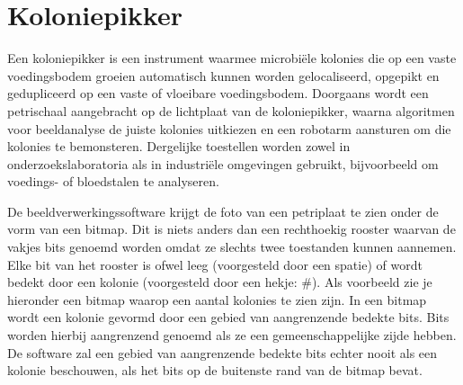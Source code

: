
\section*{Koloniepikker}
Een koloniepikker is een instrument waarmee microbi\"ele kolonies die op een vaste voedingsbodem groeien automatisch kunnen worden gelocaliseerd, opgepikt en gedupliceerd op een vaste of vloeibare voedingsbodem. Doorgaans wordt een petrischaal aangebracht op de lichtplaat van de koloniepikker, waarna algoritmen voor beeldanalyse de juiste kolonies uitkiezen en een robotarm aansturen om die kolonies te bemonsteren. Dergelijke toestellen worden zowel in onderzoekslaboratoria als in industri\"ele omgevingen gebruikt, bijvoorbeeld om voedings- of bloedstalen te analyseren.

De beeldverwerkingssoftware krijgt de foto van een petriplaat te zien onder de vorm van een bitmap. Dit is niets anders dan een rechthoekig rooster waarvan de vakjes bits genoemd worden omdat ze slechts twee toestanden kunnen aannemen. Elke bit van het rooster is ofwel leeg (voorgesteld door een spatie) of wordt bedekt door een kolonie (voorgesteld door een hekje: \#). Als voorbeeld zie je hieronder een bitmap waarop een aantal kolonies te zien zijn. In een bitmap wordt een kolonie gevormd door een gebied van aangrenzende bedekte bits. Bits worden hierbij aangrenzend genoemd als ze een gemeenschappelijke zijde hebben. De software zal een gebied van aangrenzende bedekte bits echter nooit als een kolonie beschouwen, als het bits op de buitenste rand van de bitmap bevat.

